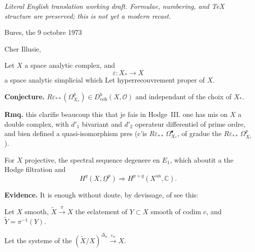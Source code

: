 \documentclass[11pt,a4paper]{article}
\theoremstyle{plain}
\theoremstyle{definition}
\newcommand{\an}{\mathrm{an}}
\newcommand{\coh}{\mathrm{coh}}
\begin{document}
\begin{center}\small\emph{Literal English translation working draft. Formulae, numbering, and TeX structure are preserved; this is not yet a modern recast.}\end{center}
\vspace{0.5em}


\begin{flushright}
Bures, the 9 octobre 1973
\end{flushright}

\vspace{0.5cm}

Cher Illusie,

\vspace{0.3cm}

Let $X$ a space analytic complex, and
\[
\varepsilon : X_{*} \longrightarrow X
\]
a space analytic simplicial which Let hyperrecouvrement proper of $X$.

\vspace{0.3cm}

\noindent\textbf{Conjecture.} \quad $R\varepsilon_{**}(\Omega^{p}_{X_{*}}) \in D^{b}_{\coh}(X,\mathcal{O})$ and independant of the choix of $X_{*}$.


\vspace{0.3cm}

\noindent\textbf{Rmq.} this clarifie beaucoup this that je fais in Hodge~III. one has mis on $X$ a double complex, with $d'_{1}$ bivariant and $d'_{2}$ operateur differentiel of prime ordre, and bien defined a quasi-isomorphism pres (c'is $R\varepsilon_{**}\,\Omega^{\bullet}_{X_{*}}$, of gradue the $R\varepsilon_{**}\,\Omega^{p}_{X_{*}}$).

\vspace{0.3cm}

For $X$ projective, the spectral sequence degenere en $E_{1}$, which aboutit a the Hodge filtration and
\[
H^{q}(X, \underline{\Omega}^{p}) \Longrightarrow H^{p+q}(X^{\an}, \mathbb{C}).
\]

\vspace{0.3cm}

\noindent\textbf{Evidence.} It is enough without doute, by devissage, of see this:

Let $X$ smooth, $\widetilde{X} \xrightarrow{\pi} X$ the eclatement of $Y \subset X$ smooth of codim $c$, and $\widetilde{Y} = \pi^{-1}(Y)$.

Let the systeme of the $(\widetilde{X}/X)^{\Delta_{n}} \xrightarrow{\varepsilon_{n}} X$.
\end{document}
